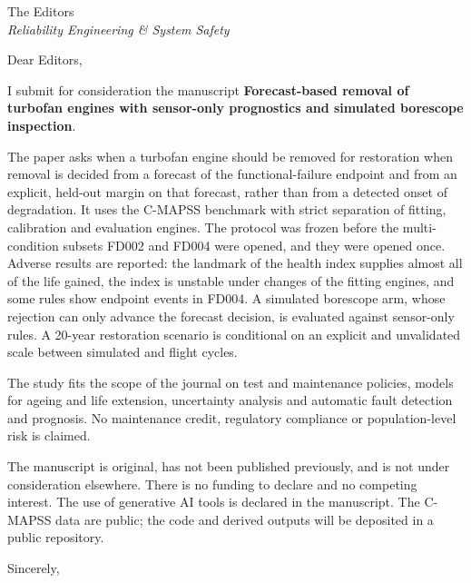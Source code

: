 \documentclass[a4paper,12pt]{letter}
\date{\today}
\newcommand{\journal}{\textit{Reliability Engineering \& System Safety}}
\begin{document}
\singlespacing
\begin{letter}{The Editors \\ \journal{}}

\opening{Dear Editors,}

I submit for consideration the manuscript \textbf{Forecast-based removal of turbofan engines with sensor-only prognostics and simulated borescope inspection}.

The paper asks when a turbofan engine should be removed for restoration when removal is decided from a forecast of the functional-failure endpoint and from an explicit, held-out margin on that forecast, rather than from a detected onset of degradation. It uses the C-MAPSS benchmark with strict separation of fitting, calibration and evaluation engines. The protocol was frozen before the multi-condition subsets FD002 and FD004 were opened, and they were opened once. Adverse results are reported: the landmark of the health index supplies almost all of the life gained, the index is unstable under changes of the fitting engines, and some rules show endpoint events in FD004. A simulated borescope arm, whose rejection can only advance the forecast decision, is evaluated against sensor-only rules. A 20-year restoration scenario is conditional on an explicit and unvalidated scale between simulated and flight cycles.

The study fits the scope of the journal on test and maintenance policies, models for ageing and life extension, uncertainty analysis and automatic fault detection and prognosis. No maintenance credit, regulatory compliance or population-level risk is claimed.

The manuscript is original, has not been published previously, and is not under consideration elsewhere. There is no funding to declare and no competing interest. The use of generative AI tools is declared in the manuscript. The C-MAPSS data are public; the code and derived outputs will be deposited in a public repository.

\closing{Sincerely,}

\end{letter}
\end{document}
